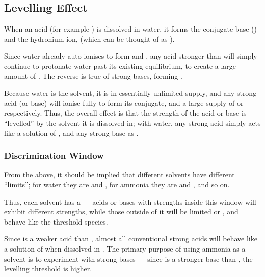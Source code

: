 

		\subsection{Levelling Effect}

			When an acid (for example ) is dissolved in water, it forms the conjugate base (\ch{\Cl-}) and the hydronium ion,  (which
			can be thought of as ).

			Since water already auto-ionises to form  and , any acid stronger than  will simply continue to protonate water
			past its existing equilibrium, to create a large amount of . The reverse is true of strong bases, forming .

			Because water is the solvent, it is in essentially unlimited supply, and any strong acid (or base) will ionise fully to form its conjugate,
			and a large supply of  or  respectively. Thus, the overall effect is that the strength of the acid or base
			is \enquote{levelled} by the solvent it is dissolved in; with water, any strong acid simply acts like a solution of ,
			and any strong base as .

			\subsubsection{Discrimination Window}

				From the above, it should be implied that different solvents have different \enquote{limits}; for water they are  and ,
				for ammonia they are  and , and so on.

				Thus, each solvent has a  --- acids or bases with strengths inside this window will exhibit different
				strengths, while those outside of it will be limited or , and behave like the threshold species.


				Since  is a weaker acid than , almost all conventional strong acids will behave like a solution of  when
				dissolved in . The primary purpose of using ammonia as a solvent is to experiment with strong bases --- since  is a
				stronger base than , the levelling threshold is higher.

